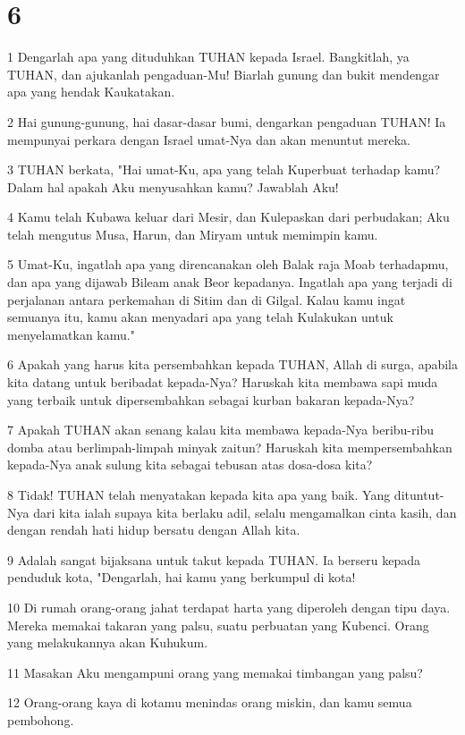 \chapter{6}

\par 1 Dengarlah apa yang dituduhkan TUHAN kepada Israel. Bangkitlah, ya TUHAN, dan ajukanlah pengaduan-Mu! Biarlah gunung dan bukit mendengar apa yang hendak Kaukatakan.
\par 2 Hai gunung-gunung, hai dasar-dasar bumi, dengarkan pengaduan TUHAN! Ia mempunyai perkara dengan Israel umat-Nya dan akan menuntut mereka.
\par 3 TUHAN berkata, "Hai umat-Ku, apa yang telah Kuperbuat terhadap kamu? Dalam hal apakah Aku menyusahkan kamu? Jawablah Aku!
\par 4 Kamu telah Kubawa keluar dari Mesir, dan Kulepaskan dari perbudakan; Aku telah mengutus Musa, Harun, dan Miryam untuk memimpin kamu.
\par 5 Umat-Ku, ingatlah apa yang direncanakan oleh Balak raja Moab terhadapmu, dan apa yang dijawab Bileam anak Beor kepadanya. Ingatlah apa yang terjadi di perjalanan antara perkemahan di Sitim dan di Gilgal. Kalau kamu ingat semuanya itu, kamu akan menyadari apa yang telah Kulakukan untuk menyelamatkan kamu."
\par 6 Apakah yang harus kita persembahkan kepada TUHAN, Allah di surga, apabila kita datang untuk beribadat kepada-Nya? Haruskah kita membawa sapi muda yang terbaik untuk dipersembahkan sebagai kurban bakaran kepada-Nya?
\par 7 Apakah TUHAN akan senang kalau kita membawa kepada-Nya beribu-ribu domba atau berlimpah-limpah minyak zaitun? Haruskah kita mempersembahkan kepada-Nya anak sulung kita sebagai tebusan atas dosa-dosa kita?
\par 8 Tidak! TUHAN telah menyatakan kepada kita apa yang baik. Yang dituntut-Nya dari kita ialah supaya kita berlaku adil, selalu mengamalkan cinta kasih, dan dengan rendah hati hidup bersatu dengan Allah kita.
\par 9 Adalah sangat bijaksana untuk takut kepada TUHAN. Ia berseru kepada penduduk kota, "Dengarlah, hai kamu yang berkumpul di kota!
\par 10 Di rumah orang-orang jahat terdapat harta yang diperoleh dengan tipu daya. Mereka memakai takaran yang palsu, suatu perbuatan yang Kubenci. Orang yang melakukannya akan Kuhukum.
\par 11 Masakan Aku mengampuni orang yang memakai timbangan yang palsu?
\par 12 Orang-orang kaya di kotamu menindas orang miskin, dan kamu semua pembohong.
